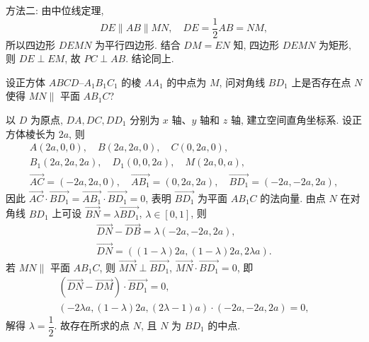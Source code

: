     方法二: 由中位线定理,
    \[DE\parallel AB\parallel MN,\quad
    DE= \frac12 AB= NM,\]
    所以四边形 $DEMN$ 为平行四边形. 结合 $DM= EN$ 知, 四边形 $DEMN$ 为矩形, 则 $DE\perp EM$, 故 $PC\perp AB$. 结论同上.
\endsolution

\begin{example}
    设正方体 $ABCD\text{--}A_1B_1C_1$ 的棱 $AA_1$ 的中点为 $M$, 问对角线 $BD_1$ 上是否存在点 $N$ 使得 $MN\parallel$ 平面 $AB_1C$?
\end{example}
\beginsolution
    以 $D$ 为原点, $DA, DC, DD_1$ 分别为 $x$ 轴、$y$ 轴和 $z$ 轴, 建立空间直角坐标系. 设正方体棱长为 $2a$, 则
    \[\begin{gathered}
        A(2a,0,0),\quad B(2a,2a,0),\quad C(0,2a,0),\\
        B_1(2a,2a,2a),\quad D_1(0,0,2a),\quad M(2a,0,a),\\
        \overrightarrow{AC}= (-2a,2a,0),\quad
        \overrightarrow{AB_1}= (0,2a,2a),\quad
        \overrightarrow{BD_1}= (-2a,-2a,2a),
    \end{gathered}\]
    因此 $\overrightarrow{AC}\cdot \overrightarrow{BD_1}= \overrightarrow{AB_1}\cdot \overrightarrow{BD_1}= 0$, 表明 $\overrightarrow{BD_1}$ 为平面 $AB_1C$ 的法向量. 由点 $N$ 在对角线 $BD_1$ 上可设 $\overrightarrow{BN}= \lambda \overrightarrow{BD_1}$, $\lambda\in [0,1]$, 则
    \[\begin{gathered}
        \overrightarrow{DN}- \overrightarrow{DB}
        = \lambda (-2a,-2a,2a),\\
        \overrightarrow{DN}
        = ((1-\lambda)2a,(1-\lambda)2a,2\lambda a).
    \end{gathered}\]
    若 $MN\parallel$ 平面 $AB_1C$, 则 $\overrightarrow{MN}\perp \overrightarrow{BD_1}$, $\overrightarrow{MN}\cdot \overrightarrow{BD_1}= 0$, 即
    \[\begin{gathered}
        (\overrightarrow{DN}- \overrightarrow{DM})\cdot \overrightarrow{BD_1}= 0,\\
        (-2\lambda a,(1-\lambda)2a,(2\lambda-1)a)\cdot (-2a,-2a,2a)= 0,
    \end{gathered}\]
    解得 $\lambda= \dfrac12$. 故存在所求的点 $N$, 且 $N$ 为 $BD_1$ 的中点.
\endsolution

      
      
